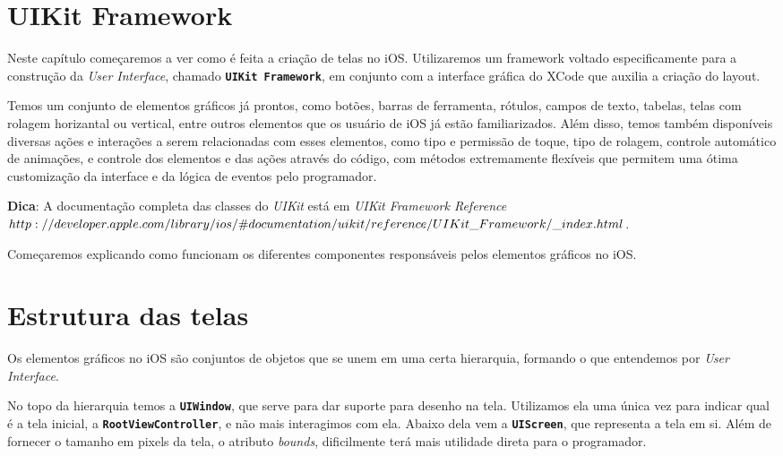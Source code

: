 \documentclass[a4paper,12pt,brazil,oneside]{book}
\begin{document}
\section{UIKit Framework}


Neste capítulo começaremos a ver como é feita a criação de telas no iOS. Utilizaremos um framework voltado especificamente para a construção da \emph{User Interface}, chamado \texttt{\textbf{UIKit Framework}}, em conjunto com a interface gráfica do XCode que auxilia a criação do layout.

Temos um conjunto de elementos gráficos já prontos, como botões, barras de ferramenta, rótulos, campos de texto, tabelas, telas com rolagem horizantal ou vertical, entre outros elementos que os usuário de iOS já estão familiarizados. Além disso, temos também disponíveis diversas ações e interações a serem relacionadas com esses elementos, como tipo e permissão de toque, tipo de rolagem, controle automático de animações, e controle dos elementos e das ações através do código, com métodos extremamente flexíveis que permitem uma ótima customização da interface e da lógica de eventos pelo programador.

\begin{framed}

\textbf{Dica}:  A documentação completa das classes do \textit{UIKit} está em 
\textit{ UIKit Framework Reference\\ \(http://developer.apple.com/library/ios/\#documentation/uikit/reference/\\UIKit\_Framework/\_index.html\)}.
\end{framed}


Começaremos explicando como funcionam os diferentes componentes responsáveis pelos elementos gráficos no iOS.

\section{Estrutura das telas}


Os elementos gráficos no iOS são conjuntos de objetos que se unem em uma certa hierarquia, formando o que entendemos por \emph{User Interface}.

No topo da hierarquia temos a \texttt{\textbf{UIWindow}}, que serve para dar suporte para desenho na tela. Utilizamos ela uma única vez para indicar qual é a tela inicial, a \texttt{\textbf{RootViewController}}, e não mais interagimos com ela. Abaixo dela vem a \texttt{\textbf{UIScreen}}, que representa a tela em si. Além de fornecer o tamanho em pixels da tela, o atributo \emph{bounds}, dificilmente terá mais utilidade direta para o programador.
\end{document}
